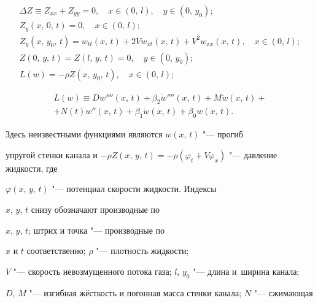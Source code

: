 \begin{gather}

\label{ankil1}

\Delta Z \equiv Z_{xx} + Z_{yy} = 0, \quad x \in

(0,\,l), \quad y \in ( 0,\,y_0);\\

\label{ankil2}

Z_y (x,\,0,\,t) = 0,\quad x \in (0,\,l);\\

\label{ankil3}

Z_y ( x,\,y_0,\,t) = w_{tt} (x,\,t) + 2Vw_{xt}

(x,\,t) + V^2 w_{xx} (x,\,t),\quad x \in (0,\,l);\\

\label{ankil4}

Z (0,\,y,\,t) = Z (l,\,y,\,t) = 0,\quad y \in (0,\,y_0);\\

\label{ankil5}

L (w) = - \rho Z (x,\,y_0,\,t),\quad x \in (0,\,l);

\end{gather}

\begin{multline*}

L( w)\equiv D{w}'''' (x,\, t) + \beta _2 \dot {w}''''(x,\, t) + M \ddot {w} (x,\, t) + \\ +

N (t) w'' (x,\, t) + \beta_1 \dot {w} (x,\, t) + \beta_0 w (x,\,t).

\end{multline*}

Здесь неизвестными функциями являются $w ( x,\,t )$ "--- прогиб

упругой стенки канала и $-\rho Z  ( x,\,y,\,t ) = - \rho

(\varphi _t + V \varphi _x)$ "--- давление жидкости, где

$\varphi ( x,\,y,\,t)$ "--- потенциал скорости жидкости. Индексы

$x$, $y$, $t$ снизу обозначают производные по

$x$, $y$, $t$; штрих и точка "--- производные по

$x$ и $t$ соответственно; $\rho $ "--- плотность жидкости;

$V$ "--- скорость невозмущенного потока газа; $l$, $y_0$ "--- длина и~ширина канала; 

$D$, $M$ "--- изгибная жёсткость и погонная масса стенки канала; $N$ "--- сжимающая


